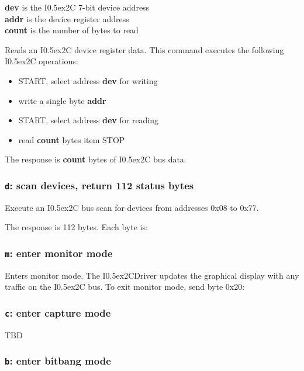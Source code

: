 \documentclass{article}
\newcommand{\two}{\raise0.5ex\hbox{\footnotesize{2}}}
\newcommand{\iic}{I\two{}C}
\newcommand{\iicdriver}{I\two{}CDriver}
\newcommand{\mach}[1]{\texttt{\textbf{#1}}}
\begin{document}
\textbf{dev} is the \iic{} 7-bit device address \\
\textbf{addr} is the device register address \\
\textbf{count} is the number of bytes to read

Reads an \iic{} device register data.
This command executes the following \iic{} operations:

\begin{itemize}
\item START, select address \textbf{dev} for writing
\item write a single byte \textbf{addr}
\item START, select address \textbf{dev} for reading
\item read \textbf{count} bytes
item STOP
\end{itemize}

The response is \textbf{count} bytes of \iic{} bus data.

\subsubsection{\mach{d}: scan devices, return 112 status bytes}

\byteseq{
  \bitbox{8}{\mach{d} (0x64)}
}

Execute an \iic{} bus scan for devices from addresses 0x08 to 0x77.

The response is 112 bytes. Each byte is:

\ackfield

\subsubsection{\mach{m}: enter monitor mode}

\byteseq{
  \bitbox{8}{\mach{m} (0x6d)}
}

Enters monitor mode.
The \iicdriver{} updates the graphical display with any
traffic on the \iic{} bus.
To exit monitor mode, send byte 0x20:


\subsubsection{\mach{c}: enter capture mode}

TBD

\subsubsection{\mach{b}: enter bitbang mode}
\end{document}
